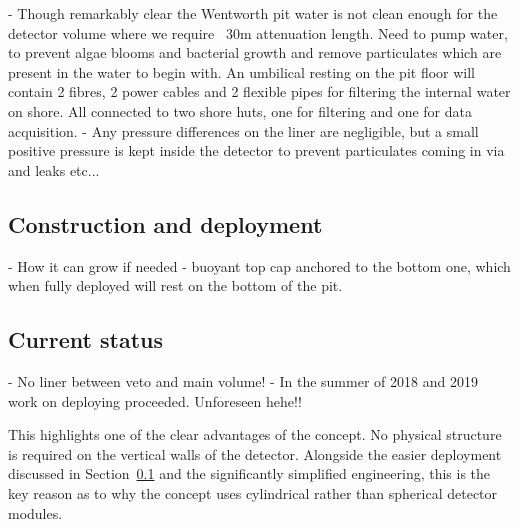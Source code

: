 - Though remarkably clear the Wentworth pit water is not clean enough for the detector volume
where we require ~30m attenuation length. Need to pump water, to prevent algae blooms and
bacterial growth and remove particulates which are present in the water to begin with. An
umbilical resting on the pit floor will contain 2 fibres, 2 power cables and 2 flexible pipes for
filtering the internal water on shore. All connected to two shore huts, one for filtering and one
for data acquisition.
- Any pressure differences on the liner are negligible, but a small positive pressure is kept
inside the detector to prevent particulates coming in via and leaks etc...

\subsection{Construction and deployment} %
\label{sec:chips_detector_deployment} %

- How it can grow if needed - buoyant top cap anchored to the bottom one, which when fully
deployed will rest on the bottom of the pit.

\subsection{Current status} %
\label{sec:chips_detector_status} %

- No liner between veto and main volume!
- In the summer of 2018 and 2019 work on deploying \chips proceeded. Unforeseen hehe!!

This highlights one of the clear advantages of the \chips concept. No physical structure is
required on the vertical walls of the detector. Alongside the easier deployment discussed in
Section~\ref{sec:chips_detector_deployment} and the significantly simplified engineering, this is
the key reason as to why the \chips concept uses cylindrical rather than spherical detector
modules.

